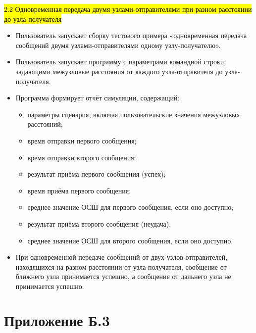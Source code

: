\hl{}

\hl{2.2 Одновременная передача двумя узлами-отправителями при разном
расстоянии до узла-получателя}

\begin{itemize}
\item
  Пользователь запускает сборку тестового примера «одновременная
  передача сообщений двумя узлами-отправителями одному узлу-получателю».
\item
  Пользователь запускает программу с параметрами командной строки,
  задающими межузловые расстояния от каждого узла-отправителя до
  узла-получателя.
\item
  Программа формирует отчёт симуляции, содержащий:

  \begin{itemize}
  \item
    параметры сценария, включая пользовательские значения межузловых
    расстояний;
  \item
    время отправки первого сообщения;
  \item
    время отправки второго сообщения;
  \item
    результат приёма первого сообщения (успех);
  \item
    время приёма первого сообщения;
  \end{itemize}

  \begin{itemize}
  \item
    среднее значение ОСШ для первого сообщения, если оно доступно;
  \end{itemize}

  \begin{itemize}
  \item
    результат приёма второго сообщения (неудача);
  \item
    среднее значение ОСШ для второго сообщения, если оно доступно.
  \end{itemize}
\item
  При одновременной передаче сообщений от двух узлов-отправителей,
  находящихся на разном расстоянии от узла-получателя, сообщение от
  ближнего узла принимается успешно, а сообщение от дальнего узла не
  принимается успешно.\hl{}
\end{itemize}

\section{Приложение
Б.3}\label{ux43fux440ux438ux43bux43eux436ux435ux43dux438ux435-ux431.3}

